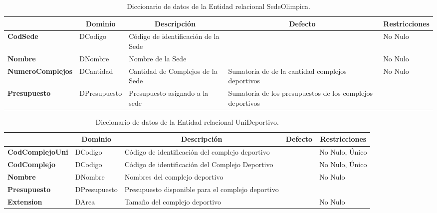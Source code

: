 \begin{table}[H]
\centering
\caption{Diccionario de datos de la Entidad relacional SedeOlimpica.}
\label{tab-DiccR-1h}
\begin{tabular}{>{\bfseries}m{4.0cm}>{}m{3.0cm}>{}m{6.0cm}>{}m{5.0cm}>{}m{2.0cm}}
\toprule
\multicolumn{1}{c}{\textbf{Atributo}} & \multicolumn{1}{c}{\textbf{Dominio}} & \multicolumn{1}{c}{\textbf{Descripción}} & \multicolumn{1}{c}{\textbf{Defecto}} & \multicolumn{1}{c}{\textbf{Restricciones}} \\ \midrule
CodSede	&	DCodigo	&	Código de identificación de la Sede	&		&	No Nulo\\
Nombre	&	DNombre	&	Nombre de la Sede	&		&	No Nulo\\
NumeroComplejos	&	DCantidad	&	Cantidad de Complejos de la Sede	&	Sumatoria de de la cantidad complejos deportivos	&	No Nulo\\
Presupuesto	&	DPresupuesto	&	Presupuesto asignado a la sede	&	Sumatoria de los presupuestos de los complejos deportivos	&	\\\bottomrule
\end{tabular}
\end{table}

\begin{table}[H]
\centering
\caption{Diccionario de datos de la Entidad relacional UniDeportivo.}
\label{tab-DiccR-1i}
\begin{tabular}{>{\bfseries}m{4.0cm}>{}m{3.0cm}>{}m{6.0cm}>{}m{5.0cm}>{}m{2.0cm}}
\toprule
\multicolumn{1}{c}{\textbf{Atributo}} & \multicolumn{1}{c}{\textbf{Dominio}} & \multicolumn{1}{c}{\textbf{Descripción}} & \multicolumn{1}{c}{\textbf{Defecto}} & \multicolumn{1}{c}{\textbf{Restricciones}} \\ \midrule
CodComplejoUni	&	DCodigo	&	Código de identificación del complejo deportivo	&		&	No Nulo, Único\\
CodComplejo	&	DCodigo	&	Código de identificación del Complejo Deportivo	&		&	No Nulo, Único\\
Nombre	&	DNombre	&	Nombres del complejo deportivo	&		&	No Nulo\\
Presupuesto	&	DPresupuesto	&	Presupuesto disponible para el complejo deportivo	&		&	\\
Extension	&	DArea	&	Tamaño del complejo deportivo	&		&	No Nulo\\\bottomrule
\end{tabular}
\end{table}

